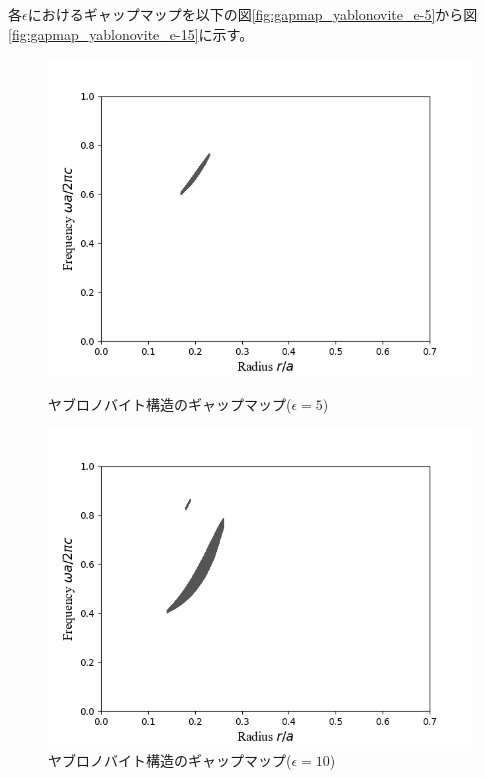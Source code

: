 \documentclass[platex,dvipdfmx]{jsreport}
\numberwithin{equation}{section}
\begin{document}
各$\epsilon$におけるギャップマップを以下の図\ref{fig:gapmap_yablonovite_e-5}から図\ref{fig:gapmap_yablonovite_e-15}に示す。

\begin{figure}[h]
  \begin{minipage}[h]{0.5\linewidth}
    \centering
    \includegraphics[keepaspectratio, scale=0.45]{results/gap_map/yablonovite_e-5.png}
    \caption{ヤブロノバイト構造のギャップマップ($\epsilon = 5$)}
    \label{fig:gapmap_yablonovite_e-5}
  \end{minipage}
  \begin{minipage}[h]{0.5\linewidth}
    \centering
    \includegraphics[keepaspectratio, scale=0.45]{results/gap_map/yablonovite_e-10.png}
    \caption{ヤブロノバイト構造のギャップマップ($\epsilon = 10$)}
    \label{fig:gapmap_yablonovite_e-10}
  \end{minipage}
\end{figure}
\end{document}
